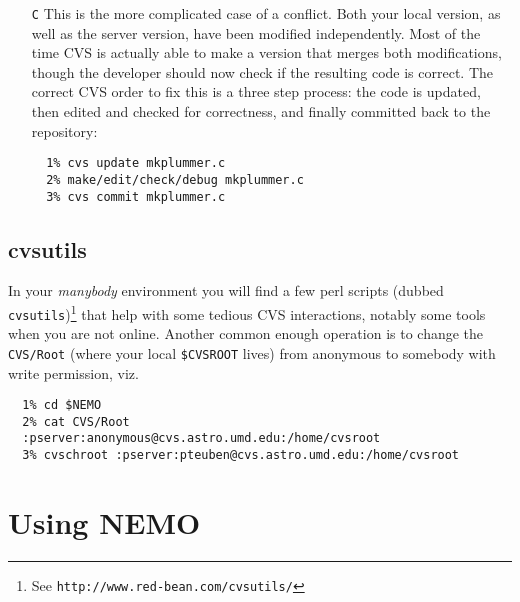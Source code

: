 \begin{enumerate}
\item[{\tt C}] This is the more complicated case of a conflict. Both your local
version, as well as the server version, have been modified independently.
Most of the time CVS is actually able to make a version that merges both
modifications, though the developer should now check if the resulting code
is correct. The correct CVS order to fix this is a three step process: the
code is updated, then edited and checked for correctness, and finally
committed back to the repository:

\footnotesize\begin{verbatim}
  1% cvs update mkplummer.c
  2% make/edit/check/debug mkplummer.c
  3% cvs commit mkplummer.c
\end{verbatim}\normalsize


\end{enumerate}

\section{cvsutils}

In your {\it manybody} environment you will find a few perl scripts
(dubbed {\tt cvsutils})\footnote{See {\tt http://www.red-bean.com/cvsutils/}}
that help with some tedious CVS interactions, notably some tools when
you are not online. Another common enough operation is to change the 
{\tt CVS/Root}
(where your local {\tt \$CVSROOT} lives) from anonymous to somebody with
write permission, viz.

\footnotesize\begin{verbatim}
  1% cd $NEMO
  2% cat CVS/Root
  :pserver:anonymous@cvs.astro.umd.edu:/home/cvsroot
  3% cvschroot :pserver:pteuben@cvs.astro.umd.edu:/home/cvsroot
\end{verbatim}\normalsize




\chapter                {Using NEMO}

